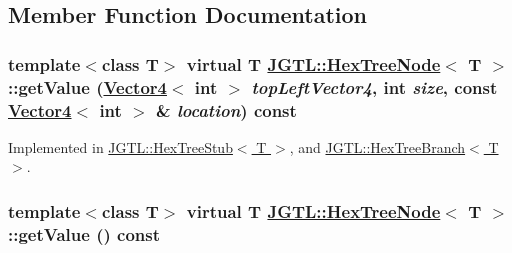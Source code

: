 \subsection{Member Function Documentation}
\hypertarget{class_j_g_t_l_1_1_hex_tree_node_64532266729bda54b7473acde6714604}{
\subsubsection[getValue]{\setlength{\rightskip}{0pt plus 5cm}template$<$class T$>$ virtual T \hyperlink{class_j_g_t_l_1_1_hex_tree_node}{JGTL::Hex\-Tree\-Node}$<$ T $>$::get\-Value (\hyperlink{class_j_g_t_l_1_1_vector4}{Vector4}$<$ int $>$ {\em top\-Left\-Vector4}, int {\em size}, const \hyperlink{class_j_g_t_l_1_1_vector4}{Vector4}$<$ int $>$ \& {\em location}) const}}
\label{class_j_g_t_l_1_1_hex_tree_node_64532266729bda54b7473acde6714604}




Implemented in \hyperlink{class_j_g_t_l_1_1_hex_tree_stub_1ebd4ddd7a7ba70896837b289167f096}{JGTL::Hex\-Tree\-Stub$<$ T $>$}, and \hyperlink{class_j_g_t_l_1_1_hex_tree_branch_e5124a6441d3e3d3c21f0d20124a3599}{JGTL::Hex\-Tree\-Branch$<$ T $>$}.\hypertarget{class_j_g_t_l_1_1_hex_tree_node_81dc320d9ae3cce6b5043696fa70a36d}{
\subsubsection[getValue]{\setlength{\rightskip}{0pt plus 5cm}template$<$class T$>$ virtual T \hyperlink{class_j_g_t_l_1_1_hex_tree_node}{JGTL::Hex\-Tree\-Node}$<$ T $>$::get\-Value () const}}
\label{class_j_g_t_l_1_1_hex_tree_node_81dc320d9ae3cce6b5043696fa70a36d}




